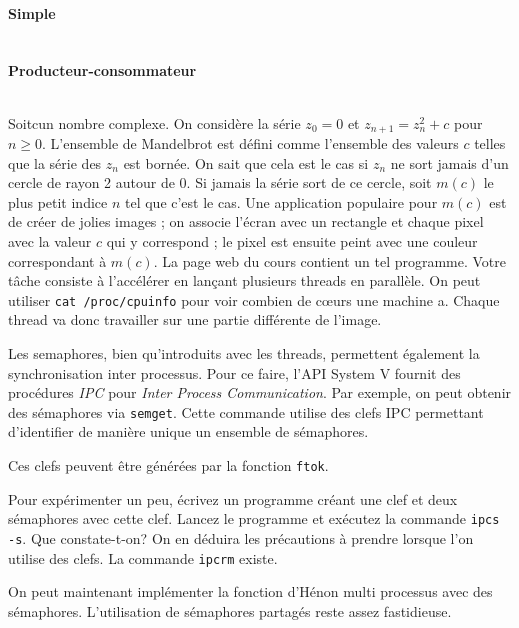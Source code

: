 \documentclass{exam}
\begin{document}
\begin{questions}
\begin{solution}
  \paragraph{Simple}
  \inputminted{C}{corrected/henon/henon_simple.c}
  \paragraph{Producteur-consommateur}
  \inputminted{C}{corrected/henon/henon_pc.c}
\end{solution}

Soitcun nombre complexe. On considère la série \(z_0 = 0\) et 
\(z_{n+1} = z_n^2 + c \) pour \(n \geq 0\).
L’ensemble de Mandelbrot est défini comme l’ensemble des valeurs \(c \)
telles que la série des \(z_n\) est bornée. On sait que cela est le cas si
\(z_n\) ne sort jamais d’un cercle de rayon 2 autour de 0.
Si jamais la série sort de ce cercle, soit \(m(c)\) le plus petit indice 
\(n \) tel que c’est le cas. Une application populaire pour \(m(c)\) est de
créer de jolies images ; on associe l’écran avec un rectangle et chaque pixel
avec la valeur \(c\) qui y correspond ; le pixel est ensuite peint avec une couleur
correspondant à \(m(c)\). La page web du cours contient un tel programme. Votre tâche
consiste à l’accélérer en lançant plusieurs threads en parallèle.
On peut utiliser \verb|cat /proc/cpuinfo| pour voir combien de c\oe urs une machine a.
Chaque thread va donc travailler sur une partie différente de l’image.

Les semaphores, bien qu'introduits avec les threads, permettent
également la synchronisation inter processus. Pour ce faire, l'API
System V fournit des procédures \textit{IPC} pour \textit{Inter
Process Communication}. Par exemple, on peut obtenir des sémaphores
via \texttt{semget}. Cette commande utilise des clefs IPC permettant
d'identifier de manière unique un ensemble de sémaphores.

Ces clefs peuvent être générées par la fonction \texttt{ftok}.

Pour expérimenter un peu, écrivez un programme créant une clef et deux
sémaphores avec cette clef. Lancez le programme et exécutez la
commande \texttt{ipcs -s}. Que constate-t-on? On en déduira les
précautions à prendre lorsque l'on utilise des clefs. La commande
\texttt{ipcrm} existe.

On peut maintenant implémenter la fonction d'Hénon multi processus
avec des sémaphores. L'utilisation de sémaphores partagés reste assez
fastidieuse.


\end{questions}
\end{document}
